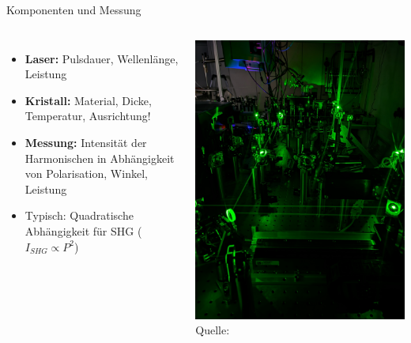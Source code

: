 \documentclass[notes=only]{beamer}
\newcommand{\figcite}[1]{\\[-3mm]{\tiny Quelle: \cite{#1}}}
\begin{document}
\begin{frame}{Komponenten und Messung}
  \begin{columns}[T,onlytextwidth]
      \begin{itemize}
        \item \textbf{Laser:} Pulsdauer, Wellenlänge, Leistung
        \pause
        \item \textbf{Kristall:} Material, Dicke, Temperatur, Ausrichtung!
        \item \textbf{Messung:} Intensität der Harmonischen in Abhängigkeit von Polarisation, Winkel, Leistung
        \pause
        \item Typisch: Quadratische Abhängigkeit für SHG ($I_{SHG} \propto P^2$)
      \end{itemize}
      \centering
      \includegraphics[height=0.8\textheight]{Images/PXL_20250318_131716572.NIGHT.jpg}
      {\figcite{Adamczyk2025}}

\end{columns}
\end{frame}
\end{document}
